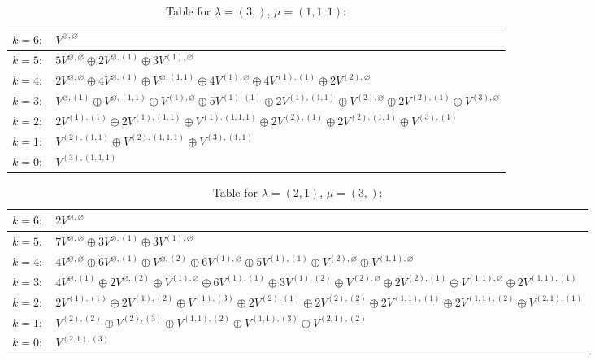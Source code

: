 \documentclass[a4paper,12pt]{article}
\begin{document}
\renewcommand{\arraystretch}{1.6} 
\begin{table}[H]
\centering
\caption{Table for $\lambda = (3,)$, $\mu = (1, 1, 1)$:}
\begin{tabular}{|>{\centering\arraybackslash}p{15cm}|}
\hline
 $k = 6: \quad V^{\varnothing, \varnothing} $ \\ \hline
 $k = 5: \quad 5 V^{\varnothing, \varnothing} \oplus 2 V^{\varnothing, (1)} \oplus 3 V^{(1), \varnothing} $ \\ \hline
 $k = 4: \quad 2 V^{\varnothing, \varnothing} \oplus 4 V^{\varnothing, (1)} \oplus V^{\varnothing, (1, 1)} \oplus 4 V^{(1), \varnothing} \oplus 4 V^{(1), (1)} \oplus 2 V^{(2), \varnothing} $ \\ \hline
 $k = 3: \quad V^{\varnothing, (1)} \oplus V^{\varnothing, (1, 1)} \oplus V^{(1), \varnothing} \oplus 5 V^{(1), (1)} \oplus 2 V^{(1), (1, 1)} \oplus V^{(2), \varnothing} \oplus 2 V^{(2), (1)} \oplus V^{(3), \varnothing} $ \\ \hline
 $k = 2: \quad 2 V^{(1), (1)} \oplus 2 V^{(1), (1, 1)} \oplus V^{(1), (1, 1, 1)} \oplus 2 V^{(2), (1)} \oplus 2 V^{(2), (1, 1)} \oplus V^{(3), (1)} $ \\ \hline
 $k = 1: \quad V^{(2), (1, 1)} \oplus V^{(2), (1, 1, 1)} \oplus V^{(3), (1, 1)} $ \\ \hline
 $k = 0: \quad V^{(3), (1, 1, 1)} $ \\ \hline
\end{tabular}
\end{table}

\renewcommand{\arraystretch}{1.6} 
\begin{table}[H]
\centering
\caption{Table for $\lambda = (2, 1)$, $\mu = (3,)$:}
\begin{tabular}{|>{\centering\arraybackslash}p{15cm}|}
\hline
 $k = 6: \quad 2 V^{\varnothing, \varnothing} $ \\ \hline
 $k = 5: \quad 7 V^{\varnothing, \varnothing} \oplus 3 V^{\varnothing, (1)} \oplus 3 V^{(1), \varnothing} $ \\ \hline
 $k = 4: \quad 4 V^{\varnothing, \varnothing} \oplus 6 V^{\varnothing, (1)} \oplus V^{\varnothing, (2)} \oplus 6 V^{(1), \varnothing} \oplus 5 V^{(1), (1)} \oplus V^{(2), \varnothing} \oplus V^{(1, 1), \varnothing} $ \\ \hline
 $k = 3: \quad 4 V^{\varnothing, (1)} \oplus 2 V^{\varnothing, (2)} \oplus V^{(1), \varnothing} \oplus 6 V^{(1), (1)} \oplus 3 V^{(1), (2)} \oplus V^{(2), \varnothing} \oplus 2 V^{(2), (1)} \oplus V^{(1, 1), \varnothing} \oplus 2 V^{(1, 1), (1)} $ \\ \hline
 $k = 2: \quad 2 V^{(1), (1)} \oplus 2 V^{(1), (2)} \oplus V^{(1), (3)} \oplus 2 V^{(2), (1)} \oplus 2 V^{(2), (2)} \oplus 2 V^{(1, 1), (1)} \oplus 2 V^{(1, 1), (2)} \oplus V^{(2, 1), (1)} $ \\ \hline
 $k = 1: \quad V^{(2), (2)} \oplus V^{(2), (3)} \oplus V^{(1, 1), (2)} \oplus V^{(1, 1), (3)} \oplus V^{(2, 1), (2)} $ \\ \hline
 $k = 0: \quad V^{(2, 1), (3)} $ \\ \hline
\end{tabular}
\end{table}
\end{document}
